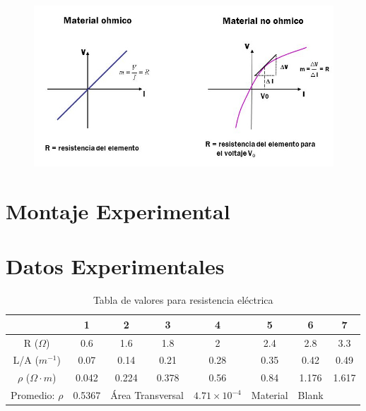 \documentclass[10pt]{article}
\begin{document}
\begin{figure}[H]
	\begin{center}
		\includegraphics[scale = 0.5]{./Images/VoltajeVsResistencia.jpg}
	\end{center}
\end{figure}


\section{Montaje Experimental}

\begin{multicols}{2}

\end{multicols}

\section{Datos Experimentales}

\begin{table}[H]
	\centering
	\caption{Tabla de valores para resistencia eléctrica}
	\label{tabla-resistencia 1ra Medicion}
	\begin{tabular}{cccccccc}
		\toprule
		                          & 1      & 2                                    & 3                     & 4        & 5      & 6     & 7     \\
		\midrule
		R ($\Omega$)              & 0.6    & 1.6                                  & 1.8                   & 2        & 2.4    & 2.8   & 3.3   \\
		L/A ($m^{-1}$)            & 0.07   & 0.14                                 & 0.21                  & 0.28     & 0.35   & 0.42  & 0.49  \\
		$\rho$ ($\Omega \cdot m$) & 0.042  & 0.224                                & 0.378                 & 0.56     & 0.84   & 1.176 & 1.617 \\
		Promedio: $\rho$          & 0.5367 & \multicolumn{2}{c}{Área Transversal} & $4.71 \times 10^{-4}$ & Material & Blank                 \\
		\bottomrule
	\end{tabular}
\end{table}
\end{document}
